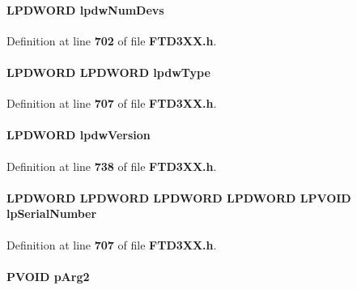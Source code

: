 \paragraph[{lpdw\+Num\+Devs}]{\setlength{\rightskip}{0pt plus 5cm}L\+P\+D\+W\+O\+RD lpdw\+Num\+Devs}\label{FTD3XX_8h_a3a7a3fae275abf0260599f0f8c9da4ca}


Definition at line {\bf 702} of file {\bf F\+T\+D3\+X\+X.\+h}.

\paragraph[{lpdw\+Type}]{\setlength{\rightskip}{0pt plus 5cm}L\+P\+D\+W\+O\+RD L\+P\+D\+W\+O\+RD lpdw\+Type}\label{FTD3XX_8h_a5d661614afd0d3b00c6e31c123cfdc8d}


Definition at line {\bf 707} of file {\bf F\+T\+D3\+X\+X.\+h}.

\paragraph[{lpdw\+Version}]{\setlength{\rightskip}{0pt plus 5cm}L\+P\+D\+W\+O\+RD lpdw\+Version}\label{FTD3XX_8h_ae0922108e7f7e3d66946a4e4681bf9d0}


Definition at line {\bf 738} of file {\bf F\+T\+D3\+X\+X.\+h}.

\paragraph[{lp\+Serial\+Number}]{\setlength{\rightskip}{0pt plus 5cm}L\+P\+D\+W\+O\+RD L\+P\+D\+W\+O\+RD L\+P\+D\+W\+O\+RD L\+P\+D\+W\+O\+RD {\bf L\+P\+V\+O\+ID} lp\+Serial\+Number}\label{FTD3XX_8h_ac7c2dc95e8dbd3a4660ccc759fe5fcb4}


Definition at line {\bf 707} of file {\bf F\+T\+D3\+X\+X.\+h}.

\paragraph[{p\+Arg2}]{\setlength{\rightskip}{0pt plus 5cm}P\+V\+O\+ID p\+Arg2}\label{FTD3XX_8h_aac3cd7510b6f89701a37f98a29a9712a}


